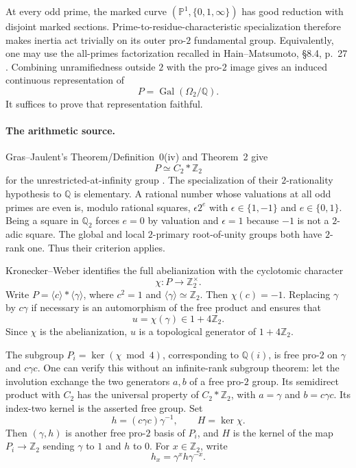 \documentclass[11pt,a4paper]{article}
\theoremstyle{definition}
\begin{document}
At every odd prime, the marked curve $(\mathbb P^1,\{0,1,\infty\})$ has good reduction with disjoint marked sections. Prime-to-residue-characteristic specialization therefore makes inertia act trivially on its outer pro-$2$ fundamental group. Equivalently, one may use the all-primes factorization recalled in Hain--Matsumoto, \S8.4, p.~27 \cite{HainMatsumoto2001}. Combining unramifiedness outside $2$ with the pro-$2$ image gives an induced continuous representation of
\[
 P=\operatorname{Gal}(\Omega_2/\mathbb Q).
\]
It suffices to prove that representation faithful.

\paragraph{The arithmetic source.}
Gras--Jaulent's Theorem/Definition~0(iv) and Theorem~2 give
\[
 P\simeq C_2*\mathbb Z_2
\]
for the unrestricted-at-infinity group \cite[pp.~1--3]{GrasJaulent2008}. The specialization of their $2$-rationality hypothesis to $\mathbb Q$ is elementary. A rational number whose valuations at all odd primes are even is, modulo rational squares, $\epsilon2^e$ with $\epsilon\in\{1,-1\}$ and $e\in\{0,1\}$. Being a square in $\mathbb Q_2$ forces $e=0$ by valuation and $\epsilon=1$ because $-1$ is not a $2$-adic square. The global and local $2$-primary root-of-unity groups both have $2$-rank one. Thus their criterion applies.

Kronecker--Weber identifies the full abelianization with the cyclotomic character
\[
 \chi:P\longrightarrow\mathbb Z_2^\times.
\]
Write $P=\langle c\rangle*\langle\gamma\rangle$, where $c^2=1$ and $\langle\gamma\rangle\simeq\mathbb Z_2$. Then $\chi(c)=-1$. Replacing $\gamma$ by $c\gamma$ if necessary is an automorphism of the free product and ensures that
\[
 u=\chi(\gamma)\in1+4\mathbb Z_2.
\]
Since $\chi$ is the abelianization, $u$ is a topological generator of $1+4\mathbb Z_2$.

The subgroup $P_i=\ker(\chi\bmod4)$, corresponding to $\mathbb Q(i)$, is free pro-$2$ on $\gamma$ and $c\gamma c$. One can verify this without an infinite-rank subgroup theorem: let the involution exchange the two generators $a,b$ of a free pro-$2$ group. Its semidirect product with $C_2$ has the universal property of $C_2*\mathbb Z_2$, with $a=\gamma$ and $b=c\gamma c$. Its index-two kernel is the asserted free group. Set
\[
 h=(c\gamma c)\gamma^{-1},\qquad H=\ker\chi.
\]
Then $(\gamma,h)$ is another free pro-$2$ basis of $P_i$, and $H$ is the kernel of the map $P_i\to\mathbb Z_2$ sending $\gamma$ to $1$ and $h$ to $0$. For $x\in\mathbb Z_2$, write
\[
 h_x=\gamma^xh\gamma^{-x}.
\]
\end{document}

